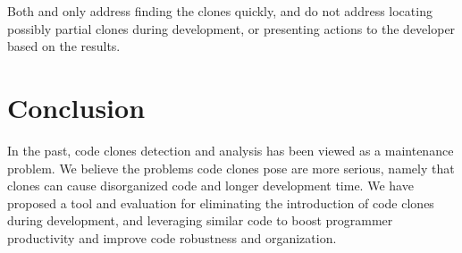 \documentclass[nocopyrightspace,10pt]{sigplanconf}
\begin{document}
Both \cite{Keivanloo2011} and \cite{Lee2010} only address finding the
clones quickly, and do not address locating possibly partial clones
during development, or presenting actions to the developer based on
the results.

\section{Conclusion}
\label{sec:conclusion}

In the past, code clones detection and analysis has been viewed as a
maintenance problem. 
We believe the problems code clones pose are 
more serious, namely that clones can cause disorganized code and
longer development time.
We have proposed a tool and evaluation for
eliminating the introduction of code clones during development, and
leveraging similar code to boost programmer productivity and improve
code robustness and organization.

%

%
%
\end{document}
